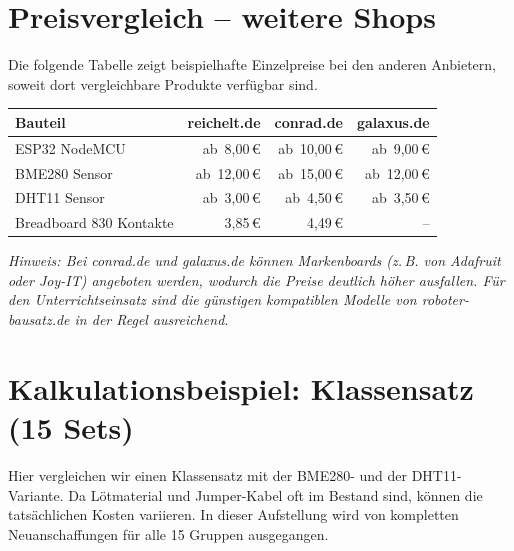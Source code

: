 \documentclass[a4paper,12pt]{article}
\begin{document}
\section{Preisvergleich -- weitere Shops}

Die folgende Tabelle zeigt beispielhafte Einzelpreise bei den anderen Anbietern, soweit dort vergleichbare Produkte verfügbar sind.

\begin{table}[h!]
\centering
\renewcommand{\arraystretch}{1.35}
\begin{tabular}{@{} l r r r @{}}
\toprule
\textbf{Bauteil}
  & \textbf{reichelt.de}
  & \textbf{conrad.de}
  & \textbf{galaxus.de} \\
\midrule

ESP32 NodeMCU
  & ab~8,00\,\euro{}
  & ab~10,00\,\euro{}
  & ab~9,00\,\euro{} \\

BME280 Sensor
  & ab~12,00\,\euro{}
  & ab~15,00\,\euro{}
  & ab~12,00\,\euro{} \\

DHT11 Sensor
  & ab~3,00\,\euro{}
  & ab~4,50\,\euro{}
  & ab~3,50\,\euro{} \\

Breadboard 830 Kontakte
  & 3,85\,\euro{}
  & 4,49\,\euro{}
  & -- \\

\bottomrule
\end{tabular}
\label{tab:vergleich}
\end{table}

\smallskip\noindent
\textit{Hinweis: Bei conrad.de und galaxus.de können Markenboards (z.\,B. von Adafruit oder Joy-IT) angeboten werden, wodurch die Preise deutlich höher ausfallen. Für den Unterrichtseinsatz sind die günstigen kompatiblen Modelle von roboter-bausatz.de in der Regel ausreichend.}


\section{Kalkulationsbeispiel: Klassensatz (15 Sets)}

Hier vergleichen wir einen Klassensatz mit der BME280- und der DHT11-Variante. Da Lötmaterial und Jumper-Kabel oft im Bestand sind, können die tatsächlichen Kosten variieren. In dieser Aufstellung wird von kompletten Neuanschaffungen für alle 15 Gruppen ausgegangen.
\end{document}
